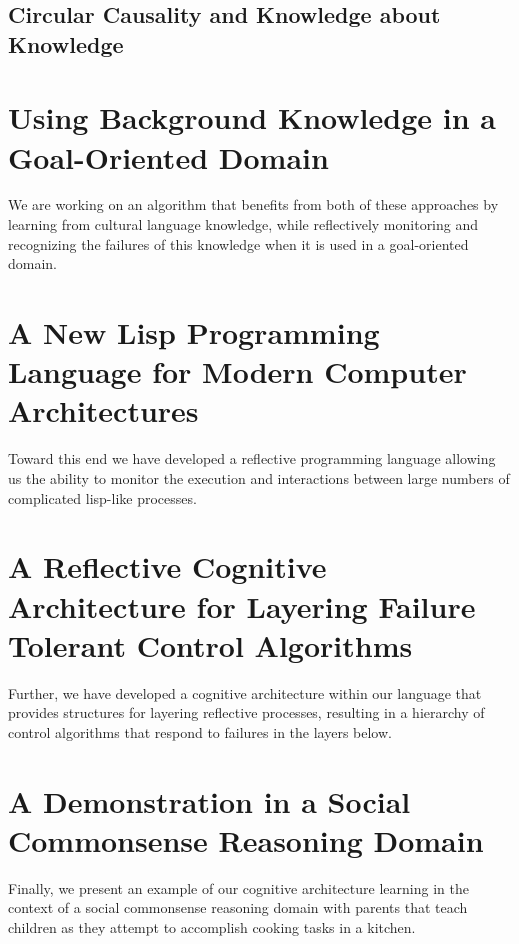 \subsection{Circular Causality and Knowledge about Knowledge}





\section{Using Background Knowledge in a Goal-Oriented Domain}

We are working on an algorithm that benefits from both of these
approaches by learning from cultural language knowledge, while
reflectively monitoring and recognizing the failures of this knowledge
when it is used in a goal-oriented domain.

\section{A New Lisp Programming Language for Modern Computer Architectures}

Toward this end we have developed a reflective programming language
allowing us the ability to monitor the execution and interactions
between large numbers of complicated lisp-like processes.

\section{A Reflective Cognitive Architecture for Layering Failure Tolerant Control Algorithms}

Further, we have developed a cognitive architecture within our
language that provides structures for layering reflective processes,
resulting in a hierarchy of control algorithms that respond to
failures in the layers below.

\section{A Demonstration in a Social Commonsense Reasoning Domain}

Finally, we present an example of our cognitive architecture learning
in the context of a social commonsense reasoning domain with parents
that teach children as they attempt to accomplish cooking tasks in a
kitchen.

